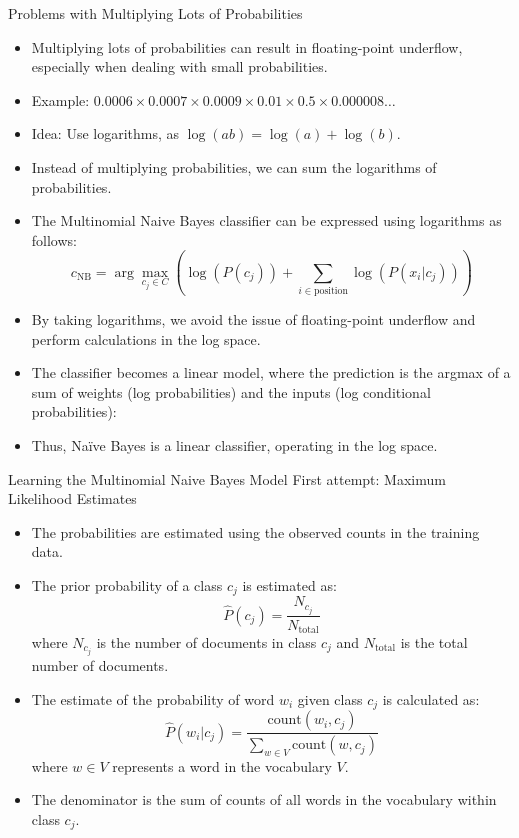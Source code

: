 \documentclass[handout]{beamer}
\begin{document}
\begin{frame}{Problems with Multiplying Lots of Probabilities}
\scriptsize
\begin{itemize}
    \item Multiplying lots of probabilities can result in floating-point underflow, especially when dealing with small probabilities.
    \item Example: $0.0006 \times 0.0007 \times 0.0009 \times 0.01 \times 0.5 \times 0.000008 \ldots$
    \item Idea: Use logarithms, as $\log(ab) = \log(a) + \log(b)$.
    \item Instead of multiplying probabilities, we can sum the logarithms of probabilities.
    \item The Multinomial Naive Bayes classifier can be expressed using logarithms as follows:
    \[
    c_{\text{NB}} = \arg\max_{c_j \in C} \left(\log(P(c_j)) + \sum_{i \in \text{position}} \log(P(x_i | c_j))\right)
    \]
    \item By taking logarithms, we avoid the issue of floating-point underflow and perform calculations in the log space.
     \item The classifier becomes a linear model, where the prediction is the argmax of a sum of weights (log probabilities) and the inputs (log conditional probabilities):
    \item Thus, Naïve Bayes is a linear classifier, operating in the log space.
    
    
\end{itemize}
\end{frame}

\begin{frame}{Learning the Multinomial Naive Bayes Model}
\scriptsize
First attempt: Maximum Likelihood Estimates
\begin{itemize}
    \item The probabilities are estimated using the observed counts in the training data.
    \item The prior probability of a class $c_j$ is estimated as:
    \[
    \hat{P}(c_j) = \frac{N_{c_j}}{N_{\text{total}}}
    \]
    where $N_{c_j}$ is the number of documents in class $c_j$ and $N_{\text{total}}$ is the total number of documents.
    \item The estimate of the probability of word $w_i$ given class $c_j$ is calculated as:
    \[
    \hat{P}(w_i | c_j) = \frac{{\text{{count}}(w_i, c_j)}}{\sum_{w\in V}{\text{{count}}(w, c_j)}}
    \]
    where $w \in V$ represents a word in the vocabulary $V$.
    \item The denominator is the sum of counts of all words in the vocabulary within class $c_j$.
\end{itemize}
\end{frame}
\end{document}
